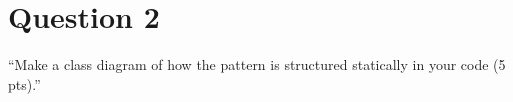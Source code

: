 \section{Question 2}

``Make a class diagram of how the pattern is structured statically in your code (5 pts).'' \\

